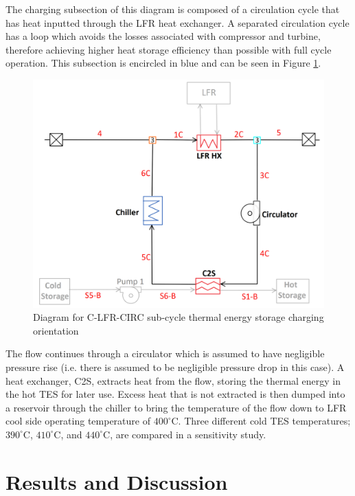 \begin{paracol}{2}
\linenumbers
\switchcolumn

The charging subsection of this diagram is composed of a circulation cycle that has heat inputted through the LFR heat exchanger. A separated circulation cycle has a loop which avoids the losses associated with compressor and turbine, therefore achieving higher heat storage efficiency than possible with full cycle operation. This subsection is encircled in blue and can be seen in Figure \ref{c-lfr-circ-sub}.


\begin{figure}[H]
    \widefigure
    \includegraphics[width=0.7\linewidth]{Definitions/c-lfr-circ-sub.pdf}
    \caption{Diagram for C-LFR-CIRC sub-cycle thermal energy storage charging orientation\label{c-lfr-circ-sub}}
\end{figure}

The flow continues through a circulator which is assumed to have negligible pressure rise (i.e. there is assumed to be negligible pressure drop in this case). A heat exchanger, C2S, extracts heat from the flow, storing the thermal energy in the hot TES for later use. Excess heat that is not extracted is then dumped into a reservoir through the chiller to bring the temperature of the flow down to LFR cool side operating temperature of $400^{\circ}$C. Three different cold TES temperatures; $390^{\circ}$C, $410^{\circ}$C, and $440^{\circ}$C, are compared in a sensitivity study. 



\section{Results and Discussion}


\end{paracol}
